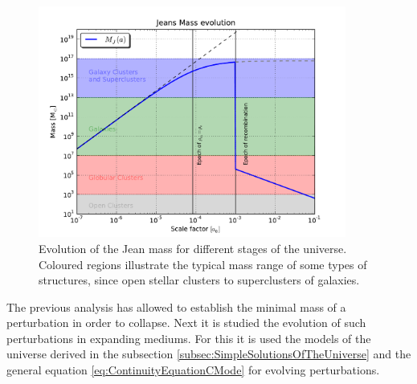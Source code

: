 \begin{figure}[htbp]
	\centering
	\includegraphics[width=0.9\textwidth]
	{./figures/2_theoretical_framework/Jeans_Mass_Evolution.pdf}

	\caption{\small{Evolution of the Jean mass for different stages of the
	universe. Coloured regions illustrate the typical mass range of some 
	types of structures, since open stellar clusters to superclusters of 
	galaxies.}}
	
	\label{fig:JeansMass}
\end{figure}
	

The previous analysis has allowed to establish the minimal mass of a 
perturbation in order to collapse. Next it is studied the evolution of 
such perturbations in expanding mediums. For this it is used the models of 
the universe derived in the subsection 
\ref{subsec:SimpleSolutionsOfTheUniverse} and the general equation 
\ref{eq:ContinuityEquationCMode} for evolving perturbations.


